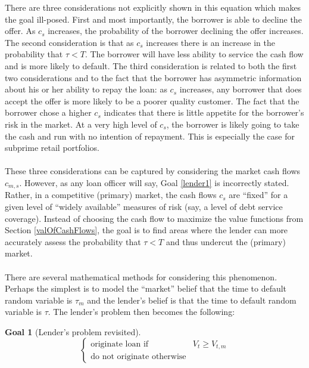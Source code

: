 \documentclass{article}
\theoremstyle{definition}
\newtheorem{goal}{Goal}
\begin{document}
There are three considerations not explicitly shown in this equation which makes the goal ill-posed.  First and most importantly, the borrower is able to decline the offer.  As \(c_s\) increases, the probability of the borrower declining the offer increases.  The second consideration is that as \(c_s\) increases there is an increase in the probability that \(\tau<T\).  The borrower will have less ability to service the cash flow and is more likely to default.  The third consideration is related to both the first two considerations and to the fact that the borrower has asymmetric information about his or her ability to repay the loan: as \(c_s\) increases, any borrower that does accept the offer is more likely to be a poorer quality customer.  The fact that the borrower chose a higher \(c_s\) indicates that there is little appetite for the borrower's risk in the market.  At a very high level of \(c_s\), the borrower is likely going to take the cash and run with no intention of repayment.  This is especially the case for subprime retail portfolios.  
\\
\\
These three considerations can be captured by considering the market cash flows \(c_{m, s}\).  However, as any loan officer will say, Goal \ref{lender1} is incorrectly stated.  Rather, in a competitive (primary) market, the cash flows \(c_s\) are ``fixed'' for a given level of ``widely available'' measures of risk (say, a level of debt service coverage).  Instead of choosing the cash flow to maximize the value functions from Section \ref{valOfCashFlows}, the goal is to find areas where the lender can more accurately assess the probability that \(\tau<T\) and thus undercut the (primary) market.  
\\
\\
There are several mathematical methods for considering this phenomenon.  Perhaps the simplest is to model the ``market'' belief that the time to default random variable is \(\tau_m\) and the lender's belief is that the time to default random variable is \(\tau\).  The lender's problem then becomes the following:


\begin{goal}[Lender's problem revisited] \label{lender2}
	\[
	\left\{
	\begin{array}{ll}
	\text{originate loan if} & V_t\geq V_{t, m}\\
	\text{do not originate otherwise} 
	\end{array} \right.
	\]
	
\end{goal}
\end{document}
